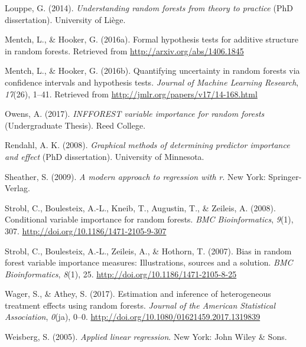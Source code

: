 \documentclass[12pt,twoside]{reedthesis}
\theoremstyle{definition}
\theoremstyle{definition}
\theoremstyle{definition}
\theoremstyle{remark}
\begin{document}
\hypertarget{ref-louppe2014}{}
Louppe, G. (2014). \emph{Understanding random forests from theory to
practice} (PhD dissertation). University of Liège.

\hypertarget{ref-mentch2016b}{}
Mentch, L., \& Hooker, G. (2016a). Formal hypothesis tests for additive
structure in random forests. Retrieved from
\url{http://arxiv.org/abs/1406.1845}

\hypertarget{ref-mentch2016a}{}
Mentch, L., \& Hooker, G. (2016b). Quantifying uncertainty in random
forests via confidence intervals and hypothesis tests. \emph{Journal of
Machine Learning Research}, \emph{17}(26), 1--41. Retrieved from
\url{http://jmlr.org/papers/v17/14-168.html}

\hypertarget{ref-owens2017}{}
Owens, A. (2017). \emph{INFFOREST variable importance for random
forests} (Undergraduate Thesis). Reed College.

\hypertarget{ref-rendahl2008}{}
Rendahl, A. K. (2008). \emph{Graphical methods of determining predictor
importance and effect} (PhD dissertation). University of Minnesota.

\hypertarget{ref-sheather2009}{}
Sheather, S. (2009). \emph{A modern approach to regression with r}. New
York: Springer-Verlag.

\hypertarget{ref-strobl2008}{}
Strobl, C., Boulesteix, A.-L., Kneib, T., Augustin, T., \& Zeileis, A.
(2008). Conditional variable importance for random forests. \emph{BMC
Bioinformatics}, \emph{9}(1), 307.
\url{http://doi.org/10.1186/1471-2105-9-307}

\hypertarget{ref-strobl2007}{}
Strobl, C., Boulesteix, A.-L., Zeileis, A., \& Hothorn, T. (2007). Bias
in random forest variable importance measures: Illustrations, sources
and a solution. \emph{BMC Bioinformatics}, \emph{8}(1), 25.
\url{http://doi.org/10.1186/1471-2105-8-25}

\hypertarget{ref-wager2017}{}
Wager, S., \& Athey, S. (2017). Estimation and inference of
heterogeneous treatment effects using random forests. \emph{Journal of
the American Statistical Association}, \emph{0}(ja), 0--0.
\url{http://doi.org/10.1080/01621459.2017.1319839}

\hypertarget{ref-weisberg2005}{}
Weisberg, S. (2005). \emph{Applied linear regression}. New York: John
Wiley \& Sons.


\end{document}
